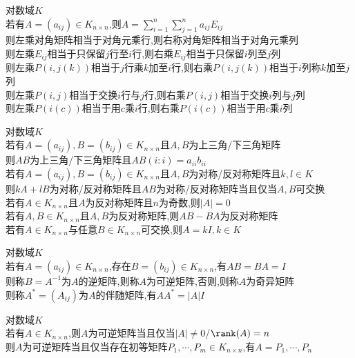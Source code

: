 \begin{dingli}
对数域$K$\\
若有$A=(a_{ij})\in K_{n\times n}$,则$A=\sum\limits_{i=1}^{n}\sum\limits_{j=1}^{n}a_{ij}E_{ij}$\\
则左乘对角矩阵相当于对角元乘行,则右称对角矩阵相当于对角元乘列\\
则左乘$E_{ij}$相当于只保留$j$行至$i$行,则右乘$E_{ij}$相当于只保留$i$列至$j$列\\
\mbox{则左乘$P(i,j(k))$相当于$j$行乘$k$加至$i$行,则右乘$P(i,j(k))$相当于$i$列称$k$加至$j$列}\\
则左乘$P(i,j)$相当于交换$i$行与$j$行,则右乘$P(i,j)$相当于交换$i$列与$j$列\\
则左乘$P(i(c))$相当于用$c$乘$i$行,则右乘$P(i(c))$相当于用$c$乘$i$列
\end{dingli}

\begin{dingli}
对数域$K$\\
若有$A=(a_{ij}),B=(b_{ij})\in K_{n\times n}$且$A,B$为上三角/下三角矩阵\\
则$AB$为上三角/下三角矩阵且$AB(i:i)=a_{ii}b_{ii}$\\
若有$A=(a_{ij}),B=(b_{ij})\in K_{n\times n}$且$A,B$为对称/反对称矩阵且$k,l\in K$\\
则$kA+lB$为对称/反对称矩阵且$AB$为对称/反对称矩阵当且仅当$A,B$可交换\\
若有$A\in K_{n\times n}$且$A$为反对称矩阵且$n$为奇数,则$|A|=0$\\
若有$A,B\in K_{n\times n}$且$A,B$为反对称矩阵,则$AB-BA$为反对称矩阵\\
若有$A\in K_{n\times n}$与任意$B\in K_{n\times n}$可交换,则$A=kI,k\in K$
\end{dingli}

\begin{dingyi}
对数域$K$\\
若有$A=(a_{ij})\in K_{n\times n}$,存在$B=(b_{ij})\in K_{n\times n}$,有$AB=BA=I$\\
则称$B=A^{-1}$为$A$的逆矩阵,则称$A$为可逆矩阵,否则,则称$A$为奇异矩阵\\
则称$A^*=(A_{ij})$为$A$的伴随矩阵,有$AA^*=|A|I$
\end{dingyi}

\begin{dingli}
对数域$K$\\
若有$A\in K_{n\times n}$,则$A$为可逆矩阵当且仅当$|A|\neq0$/$\rank(A)=n$\\
则$A$为可逆矩阵当且仅当存在初等矩阵$P_1,\cdots,P_m\in K_{n\times n}$,有$A=P_1,\cdots,P_n$
\end{dingli}

